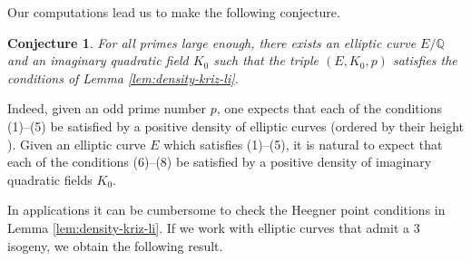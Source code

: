 \documentclass[12pt]{amsart}
\newtheorem{conjecture}[theorem]{Conjecture}
\newcommand{\Q}{\mathbb{Q}}
\numberwithin{equation}{section}
\begin{document}
Our computations lead us to make the following conjecture.
\begin{conjecture}
    For all primes large enough, there exists an elliptic curve $E/\Q$ and an imaginary quadratic field $K_0$ such that the triple $(E,K_0,p)$ satisfies the conditions of Lemma \ref{lem:density-kriz-li}.
\end{conjecture}
Indeed, given an odd prime number $p$, one expects that each of the conditions (1)--(5) be satisfied by a positive density of elliptic curves (ordered by their height \cite{Brumerinventiones}). Given an elliptic curve $E$ which satisfies (1)--(5), it is natural to expect that each of the conditions (6)--(8) be satisfied by a positive density of imaginary quadratic fields $K_0$. 

In applications it can be cumbersome to check the Heegner point conditions in Lemma \ref{lem:density-kriz-li}. If we work with elliptic curves that admit a $3$ isogeny, we obtain the following result. 
\end{document}
